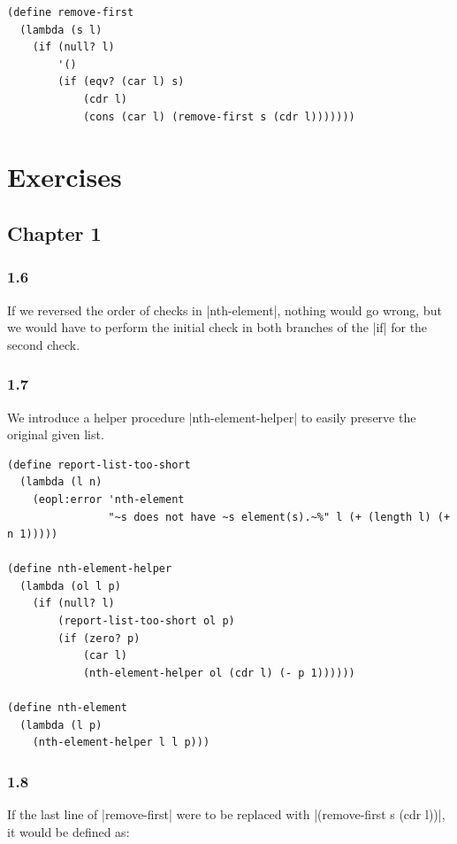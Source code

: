 \documentclass[a4paper]{article}
\begin{document}
\begin{lstlisting}
(define remove-first
  (lambda (s l)
    (if (null? l)
        '()
        (if (eqv? (car l) s)
            (cdr l)
            (cons (car l) (remove-first s (cdr l)))))))
\end{lstlisting}

\newpage

\section{Exercises}

\subsection{Chapter 1}

\subsubsection*{1.6}

If we reversed the order of checks in |nth-element|, nothing would go wrong, but we would have to perform the initial check in both branches of the |if| for the second check.

\subsubsection*{1.7}

We introduce a helper procedure |nth-element-helper| to easily preserve the original given list.

\begin{lstlisting}
(define report-list-too-short
  (lambda (l n)
    (eopl:error 'nth-element
                "~s does not have ~s element(s).~%" l (+ (length l) (+ n 1)))))

(define nth-element-helper
  (lambda (ol l p)
    (if (null? l)
        (report-list-too-short ol p)
        (if (zero? p)
            (car l)
            (nth-element-helper ol (cdr l) (- p 1))))))

(define nth-element
  (lambda (l p)
    (nth-element-helper l l p)))
\end{lstlisting}

\subsubsection*{1.8}

If the last line of |remove-first| were to be replaced with |(remove-first s (cdr l))|, it would be defined as:
\end{document}
